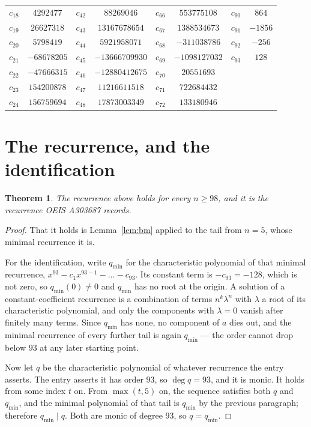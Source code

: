 \documentclass[11pt,a4paper]{article}
\theoremstyle{plain}
\newtheorem{theorem}{Theorem}
\theoremstyle{definition}
\begin{document}
\begin{center}
\begin{tabular}{cccccccc}
$c_{18}$ & $4292477$ & $c_{42}$ & $88269046$ & $c_{66}$ & $553775108$ & $c_{90}$ & $864$ \\
$c_{19}$ & $26627318$ & $c_{43}$ & $13167678654$ & $c_{67}$ & $1388534673$ & $c_{91}$ & $-1856$ \\
$c_{20}$ & $5798419$ & $c_{44}$ & $5921958071$ & $c_{68}$ & $-311038786$ & $c_{92}$ & $-256$ \\
$c_{21}$ & $-68678205$ & $c_{45}$ & $-13666709930$ & $c_{69}$ & $-1098127032$ & $c_{93}$ & $128$ \\
$c_{22}$ & $-47666315$ & $c_{46}$ & $-12880412675$ & $c_{70}$ & $20551693$ &  &  \\
$c_{23}$ & $154200878$ & $c_{47}$ & $11216611518$ & $c_{71}$ & $722684432$ &  &  \\
$c_{24}$ & $156759694$ & $c_{48}$ & $17873003349$ & $c_{72}$ & $133180946$ &  &  \\
\end{tabular}
\end{center}

\section{The recurrence, and the identification}

\begin{theorem}
The recurrence above holds for every $n\ge98$, and it is the recurrence OEIS A303687 records.
\end{theorem}

\begin{proof}
That it holds is Lemma~\ref{lem:bm} applied to the tail from $n=5$, whose minimal
recurrence it is.

For the identification, write $q_{\min}$ for the characteristic polynomial of that minimal
recurrence, $x^{93}-c_1x^{93-1}-\dots-c_{93}$. Its constant term is
$-c_{93}=-128$, which is not zero, so $q_{\min}(0)\neq0$ and $q_{\min}$ has no
root at the origin. A solution of a constant-coefficient recurrence is a combination of terms
$n^{k}\lambda^{n}$ with $\lambda$ a root of its characteristic polynomial, and only the
components with $\lambda=0$ vanish after finitely many terms. Since $q_{\min}$ has none, no
component of $a$ dies out, and the minimal recurrence of every further tail is again
$q_{\min}$ --- the order cannot drop below $93$ at any later starting point.

Now let $q$ be the characteristic polynomial of whatever recurrence the entry asserts. The
entry asserts it has order $93$, so $\deg q=93$, and it is monic. It holds from some
index $t$ on. From $\max(t,5)$ on, the sequence satisfies both $q$ and $q_{\min}$, and
the minimal polynomial of that tail is $q_{\min}$ by the previous paragraph; therefore
$q_{\min}\mid q$. Both are monic of degree $93$, so $q=q_{\min}$.
\end{proof}
\end{document}
